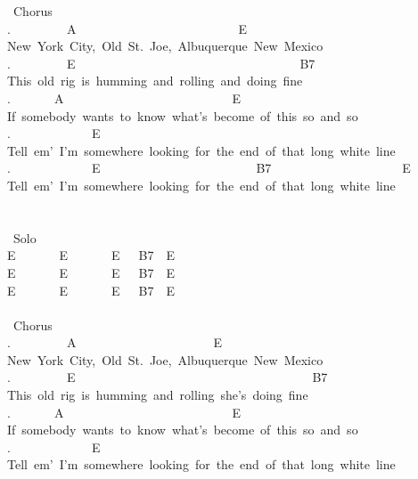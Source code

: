 {\lbrack\ Chorus\rbrack\\
.\ \ \ \ \ \ \ \ \ A\ \ \ \ \ \ \ \ \ \ \ \ \ \ \ \ \ \ \ \ \ \ \ \ \ \ E\ \ \\
New\ York\ City,\ Old\ St.\ Joe,\ Albuquerque\ New\ Mexico\\
.\ \ \ \ \ \ \ \ \ E\ \ \ \ \ \ \ \ \ \ \ \ \ \ \ \ \ \ \ \ \ \ \ \ \ \ \ \ \ \ \ \ \ \ \ \ B7\\
This\ old\ rig\ is\ humming\ and\ rolling\ and\ doing\ fine\\
.\ \ \ \ \ \ \ A\ \ \ \ \ \ \ \ \ \ \ \ \ \ \ \ \ \ \ \ \ \ \ \ \ \ \ E\ \ \\
If\ somebody\ wants\ to\ know\ what's\ become\ of\ this\ so\ and\ so\\
.\ \ \ \ \ \ \ \ \ \ \ \ \ E\\
Tell\ em'\ I'm\ somewhere\ looking\ for\ the\ end\ of\ that\ long\ white\ line\\
.\ \ \ \ \ \ \ \ \ \ \ \ \ E\ \ \ \ \ \ \ \ \ \ \ \ \ \ \ \ \ \ \ \ \ \ \ \ \ B7\ \ \ \ \ \ \ \ \ \ \ \ \ \ \ \ \ \ \ \ \ E\ \\
Tell\ em'\ I'm\ somewhere\ looking\ for\ the\ end\ of\ that\ long\ white\ line\\
\\
\\
\lbrack\ Solo\rbrack\\
E\ \ \ \ \ \ \ E\ \ \ \ \ \ \ E\ \ \ B7\ \ E\ \ \ \\
E\ \ \ \ \ \ \ E\ \ \ \ \ \ \ E\ \ \ B7\ \ E\\
E\ \ \ \ \ \ \ E\ \ \ \ \ \ \ E\ \ \ B7\ \ E\\
\\
\lbrack\ Chorus\rbrack\\
.\ \ \ \ \ \ \ \ \ A\ \ \ \ \ \ \ \ \ \ \ \ \ \ \ \ \ \ \ \ \ \ E\ \ \\
New\ York\ City,\ Old\ St.\ Joe,\ Albuquerque\ New\ Mexico\\
.\ \ \ \ \ \ \ \ \ E\ \ \ \ \ \ \ \ \ \ \ \ \ \ \ \ \ \ \ \ \ \ \ \ \ \ \ \ \ \ \ \ \ \ \ \ \ \ B7\\
This\ old\ rig\ is\ humming\ and\ rolling\ she's\ doing\ fine\\
.\ \ \ \ \ \ \ A\ \ \ \ \ \ \ \ \ \ \ \ \ \ \ \ \ \ \ \ \ \ \ \ \ \ \ E\ \ \\
If\ somebody\ wants\ to\ know\ what's\ become\ of\ this\ so\ and\ so\\
.\ \ \ \ \ \ \ \ \ \ \ \ \ E\\
Tell\ em'\ I'm\ somewhere\ looking\ for\ the\ end\ of\ that\ long\ white\ line\\
}

